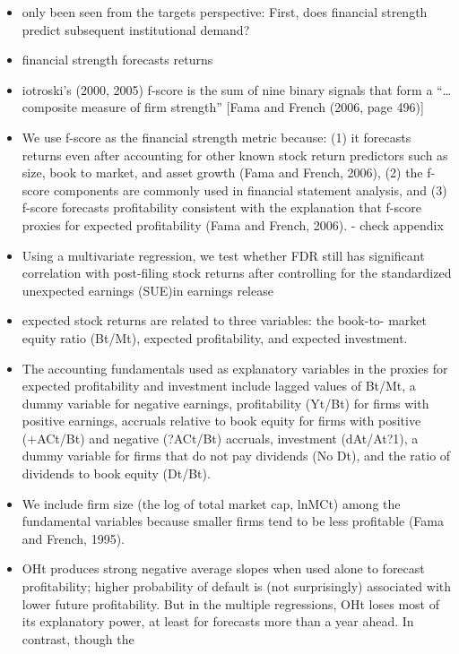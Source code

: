 \documentclass[12pt]{article}
\begin{document}
\begin{itemize}
        \item only been seen from the targets perspective: First, does financial strength predict
        subsequent institutional demand? \citet{Choi2012}
        \item financial strength forecasts returns \citet{Choi2012}
        \item iotroski’s (2000, 2005) f-score is the sum of nine binary signals that form a “…composite measure of firm strength” [Fama and French (2006, page 496)] \citet{Choi2012}
        \item We use f-score as the financial strength metric because: (1) it forecasts returns even after accounting for other known stock return predictors such as size, book to market, and asset growth (Fama and French, 2006), (2) the f-score components are commonly used in financial statement analysis, and (3) f-score forecasts profitability consistent with the explanation that f-score proxies for expected profitability (Fama and French, 2006).\citet{Choi2012} - check appendix 
        \item Using a multivariate regression, we test whether FDR still has significant correlation with post-filing stock returns after controlling for the standardized unexpected earnings (SUE)in earnings release \citet{You2009}
        \item expected stock returns are related to three variables: the book-to-
        market equity ratio (Bt/Mt), expected profitability, and expected investment.\citet{Fama2006}
        \item The accounting fundamentals used as explanatory variables in the proxies for expected profitability and investment include lagged values of Bt/Mt, a dummy variable for negative earnings, profitability (Yt/Bt) for firms with positive earnings, accruals relative to book
        equity for firms with positive (+ACt/Bt) and negative (?ACt/Bt) accruals, investment (dAt/At?1), a dummy variable for firms that do not pay dividends (No Dt), and the ratio of dividends to book equity (Dt/Bt).\citet{Fama2006}
        \item We include firm size (the log of total market cap, lnMCt) among the fundamental variables because smaller firms tend to be less profitable (Fama and French, 1995).\citet{Fama2006}
        \item OHt produces strong negative average slopes when used alone to forecast profitability; higher probability of default is (not surprisingly) associated
        with lower future profitability. But in the multiple regressions, OHt loses most of its explanatory power, at least for forecasts more than a year ahead. In contrast, though the

\end{itemize}
\end{document}
